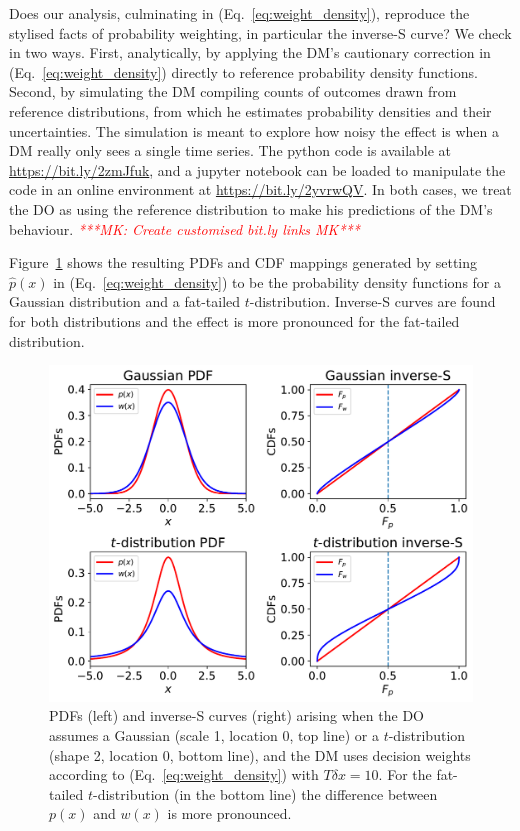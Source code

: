 \documentclass[a4paper, 12pt]{article}
\newcommand{\eref}[1]{(Eq.~\ref{eq:#1})}
\newcommand{\flabel}[1]{\label{fig:#1}}
\newcommand{\Fref}[1]{Figure~\ref{fig:#1}}
\newcommand{\MK}[1]{\textcolor{red}{\textit{***MK: #1 MK***}}}
\begin{document}
Does our analysis, culminating in \eref{weight_density}, reproduce the stylised facts of probability weighting, in particular the inverse-S curve? We check in two ways. First, analytically, by applying the DM's cautionary correction in \eref{weight_density} directly to reference probability density functions. Second, by simulating the DM compiling counts of outcomes drawn from reference distributions, from which he estimates probability densities and their uncertainties. The simulation is meant to explore how noisy the effect is when a DM really only sees a single time series. The python code is available at \url{https://bit.ly/2zmJfuk}, and a jupyter notebook can be loaded to manipulate the code in an online environment at \url{https://bit.ly/2yvrwQV}. In both cases, we treat the DO as using the reference distribution to make his predictions of the DM's behaviour.
\MK{Create customised bit.ly links}

\Fref{square_root_error} shows the resulting PDFs and CDF mappings generated by setting $\hat{p}(x)$ in \eref{weight_density} to be the probability density functions for a Gaussian distribution and a fat-tailed $t$-distribution. Inverse-S curves are found for both distributions and the effect is more pronounced for the fat-tailed distribution.
\begin{figure}[htb]
\centering
\includegraphics[width=1.0\textwidth]{./figs/square_root_error.pdf}
\caption{PDFs (left) and inverse-S curves (right) arising when the DO assumes a Gaussian (scale 1, location 0, top line) or a $t$-distribution (shape 2, location 0, bottom line), and the DM uses decision weights according to \eref{weight_density} with $T\delta x=10$. For the fat-tailed $t$-distribution (in the bottom line) the difference between $p(x)$ and $w(x)$ is more pronounced.}
\flabel{square_root_error}
\end{figure}
\end{document}
